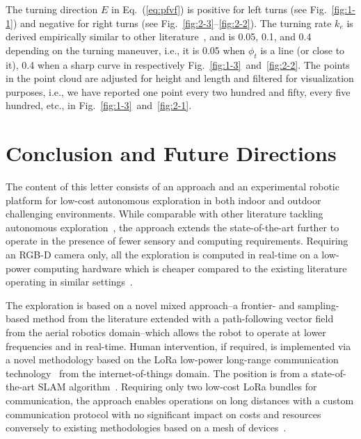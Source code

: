 \documentclass[lettersize,journal]{IEEEtran}
\theoremstyle{definition}
\begin{document}
The turning direction $E$ in Eq.~(\ref{eq:pfvf}) is positive for left turns (see Fig.~\ref{fig:1-1}) and negative for right turns (see Fig.~\ref{fig:2-3}--\ref{fig:2-2}). The turning rate $k_e$ is derived empirically similar to other literature~\cite{seewald2022energy,garcia2017guidance}, and is 0.05, 0.1, and 0.4 depending on the turning maneuver, i.e., it is 0.05 when $\phi_t$ is a line (or close to it), 0.4 when a sharp curve in respectively Fig.~\ref{fig:1-3}~and~\ref{fig:2-2}. The points in the point cloud are adjusted for height and length and filtered for visualization purposes, i.e., we have reported one point every two hundred and fifty, every five hundred, etc., in Fig.~\ref{fig:1-3}~and~\ref{fig:2-1}.

\section{Conclusion and Future Directions}
\label{sec:cf}

The content of this letter consists of an %
approach and an experimental robotic platform for low-cost autonomous exploration in both indoor and outdoor challenging environments. While comparable with other literature tackling autonomous exploration~\cite{lluvia2021active,placed2022survey,julia2012comparison}, the approach extends the state-of-the-art further to operate in the presence of fewer sensory and computing requirements. Requiring an RGB-D camera only, all the exploration is computed in real-time on a low-power computing hardware which is cheaper compared to the existing literature operating in similar settings~\cite{roucek2020darpa,tranzatto2022cerberus,kim2022autonomous,dang2019graph}. 

The exploration is based on a novel mixed approach--a frontier- and sampling-based method from the literature extended with a path-following vector field~\cite{seewald2022energy,garcia2017guidance,seewaldphdthesis} from the aerial robotics domain--which allows the robot to operate at lower frequencies and in real-time. 
Human intervention, if required, is implemented via a novel methodology based on the LoRa low-power long-range communication technology~\cite{shanmuga2020survey} from the internet-of-things domain. The position is from a state-of-the-art SLAM algorithm~\cite{labbe2019rtab}.
Requiring only two low-cost LoRa bundles for communication, the approach enables operations on long distances with a custom communication protocol with no significant impact on costs and resources conversely to existing methodologies based on a mesh of devices~\cite{surmann2003autonomous,tardioli2019ground,ebadi2020lamp,roucek2020darpa,tranzatto2022cerberus,kulkarni2022autonomous}.
\end{document}
